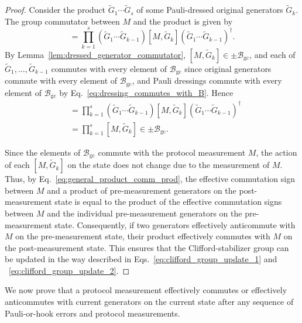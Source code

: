 \documentclass[
 reprint,
 amsmath,amssymb,
 pra,superscriptaddress, nofootinbib
]{revtex4-2}
\theoremstyle{definition}
\theoremstyle{plain}
\begin{document}
\begin{proof}
Consider the product $\tilde{G}_1\cdots \tilde{G}_s$ of some Pauli-dressed original generators $\tilde{G}_k$.
The group commutator between $M$ and the product is given by
\begin{equation}
  [M,\tilde{G}_1\cdots \tilde{G}_s]
  =
  \prod_{k=1}^{s}
  (\tilde{G}_1 \cdots \tilde{G}_{k-1})
  [M,\tilde{G}_{k}]
  (\tilde{G}_1 \cdots \tilde{G}_{k-1})^\dagger.
  \label{eq:general_product_comm}
\end{equation}
By Lemma~\ref{lem:dressed_generator_commutator}, $[M,\tilde{G}_{k}]\in\pm\mathcal{B}_{\mathrm{gc}}$, and each of $\tilde{G}_1, \ldots ,\tilde{G}_{k-1}$ commutes with every element of $\mathcal{B}_{\mathrm{gc}}$ since original generators commute with every element of $\mathcal{B}_{\mathrm{gc}}$, and Pauli dressings commute with every element of $\mathcal{B}_{\mathrm{gc}}$ by Eq.~\eqref{eq:dressing_commutes_with_B}. Hence
\begin{align}
  [M,\tilde{G}_1\cdots \tilde{G}_s]
  &=
  \prod_{k=1}^{s}
  (\tilde{G}_1 \cdots \tilde{G}_{k-1})
  [M,\tilde{G}_{k}]
  (\tilde{G}_1 \cdots \tilde{G}_{k-1})^\dagger \\
  &=
  \prod_{k=1}^{s}
  [M,\tilde{G}_{k}] \in \pm \mathcal{B}_{\mathrm{gc}}.
  \label{eq:general_product_comm_prod}
\end{align}

Since the elements of $\mathcal{B}_{\mathrm{gc}}$ commute with the protocol measurement $M$, the action of each $[M,\tilde{G}_{k}]$ on the state does not change due to the measurement of $M$. 
Thus, by Eq.~\eqref{eq:general_product_comm_prod}, the effective commutation sign between $M$ and a product of pre-measurement generators on the post-measurement state is equal to the product of the effective commutation signs between $M$ and the individual pre-measurement generators on the pre-measurement state. 
Consequently, if two generators effectively anticommute with $M$ on the pre-measurement state, their product effectively commutes with $M$ on the post-measurement state. 
This ensures that the Clifford-stabilizer group can be updated in the way described in Eqs.~\eqref{eq:clifford_group_update_1} and ~\eqref{eq:clifford_group_update_2}.
\end{proof}

We now prove that a protocol measurement effectively commutes or effectively anticommutes with current generators on the current state after any sequence of Pauli-or-hook errors and protocol measurements.
\end{document}
